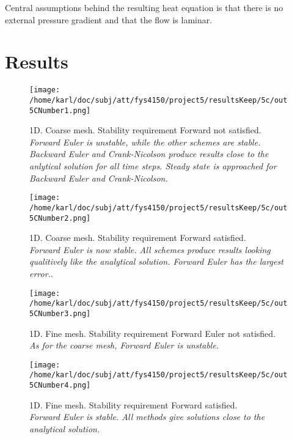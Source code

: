 \documentclass{article}
\begin{document}
Central assumptions behind the resulting heat equation is that there is no external pressure gradient and that the flow is laminar. 

\section{Results}

\begin{minipage}{.45\textwidth} 
	\begin{figure}[H]
		\centering
		\texttt{[image: /home/karl/doc/subj/att/fys4150/project5/resultsKeep/5c/out5CNumber1.png]}
		\caption{1D. Coarse mesh. Stability requirement Forward not satisfied.\\ \textit{Forward Euler is unstable, while the other schemes are stable. Backward Euler and Crank-Nicolson produce results close to the anlytical solution for all time steps. Steady state is approached for Backward Euler and Crank-Nicolson.}}
		\label{1}
	\end{figure}
\end{minipage}\hfill
\begin{minipage}{.45\textwidth} 
	\begin{figure}[H]
		\centering
		\texttt{[image: /home/karl/doc/subj/att/fys4150/project5/resultsKeep/5c/out5CNumber2.png]}
		\caption{1D. Coarse mesh. Stability requirement Forward satisfied.\\ \textit{Forward Euler is now stable. All schemes produce results looking qualitively like the analytical solution. Forward Euler has the largest error.}.}
		\label{1}
	\end{figure}
\end{minipage}\hfill
\vspace{2ex}

\begin{minipage}{.45\textwidth} 
	\begin{figure}[H]
		\centering
		\texttt{[image: /home/karl/doc/subj/att/fys4150/project5/resultsKeep/5c/out5CNumber3.png]}
		\caption{1D. Fine mesh. Stability requirement Forward Euler not satisfied.\\ \textit{As for the coarse mesh, Forward Euler is unstable.}}
		\label{fig:fig3}
	\end{figure}
\end{minipage}\hfill
\begin{minipage}{.45\textwidth} 
	\begin{figure}[H]
		\centering
		\texttt{[image: /home/karl/doc/subj/att/fys4150/project5/resultsKeep/5c/out5CNumber4.png]}
		\caption{1D. Fine mesh. Stability requirement Forward satisfied.\\ \textit{Forward Euler is stable. All methods give solutions close to the analytical solution.}}
		\label{fig:1dFineMeshAll}
	\end{figure}
\end{minipage}\hfill
\vspace{2ex}
\end{document}
